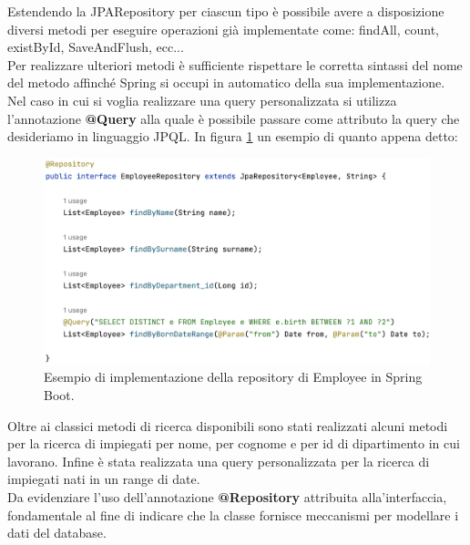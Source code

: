 Estendendo la JPARepository per ciascun tipo è possibile avere a disposizione diversi metodi per eseguire operazioni già implementate come: findAll, count, existById, SaveAndFlush, ecc...\\
Per realizzare ulteriori metodi è sufficiente rispettare le corretta sintassi del nome del metodo affinché Spring si occupi in automatico della sua implementazione.\\
Nel caso in cui si voglia realizzare una query personalizzata si utilizza l'annotazione \textbf{@Query} alla quale è possibile passare come attributo la query che desideriamo in linguaggio JPQL. In figura \ref{employee-repository} un esempio di quanto appena detto:
\FloatBarrier
\begin{figure}[!ht]
\centering
\includegraphics[width=1\linewidth]{immagini/employee_repository.png}
\caption{Esempio di implementazione della repository di Employee in Spring Boot.}
\label{employee-repository}
\end{figure}
\FloatBarrier
Oltre ai classici metodi di ricerca disponibili sono stati realizzati alcuni metodi per la ricerca di impiegati per nome, per cognome e per id di dipartimento in cui lavorano. Infine è stata realizzata una query personalizzata per la ricerca di impiegati nati in un range di date.\\
Da evidenziare l'uso dell'annotazione \textbf{@Repository} attribuita alla'interfaccia, fondamentale al fine di indicare che la classe fornisce meccanismi per modellare i dati del database.
